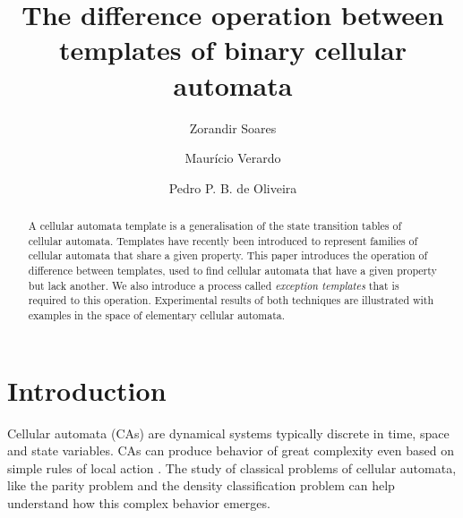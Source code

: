 \documentclass{llncs}
\begin{document}
\pagestyle{headings}  %

\title{The difference operation between templates of binary cellular automata}


\author{Zorandir Soares \and Maurício Verardo \and
Pedro P. B. de Oliveira}




\maketitle

\begin{abstract}
A cellular automata template is a generalisation of the state transition tables of cellular automata. Templates have recently been introduced to represent families of cellular automata that share a given property. This paper introduces the operation of difference between templates, used to find cellular automata that have a given property but lack another. We also introduce a process called \textit{exception templates} that is required to this operation. Experimental results of both techniques are illustrated with examples in the space of elementary cellular automata.
\end{abstract}
%
\section{Introduction}
\label{sec:introducao}
Cellular automata (CAs) are dynamical systems typically discrete in time, space and state variables.
CAs can produce behavior of great complexity even based on simple rules of local action \cite{wolfram2002}. The study of classical problems of cellular automata, like the parity problem \cite{Betel2013} and the density classification problem \cite{deOliveira2014density} can help understand how this complex behavior emerges.
\end{document}
